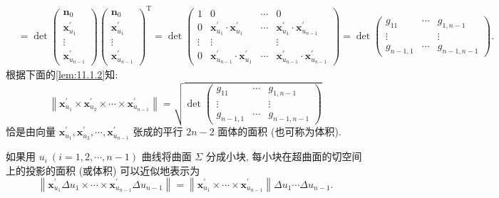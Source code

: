 \begin{definition}
\begin{align*}
  & =\operatorname{det}\begin{pmatrix}
      \boldsymbol{n}_{0} \\ \boldsymbol{x}_{u_{1}}^{\prime} \\ \vdots \\ \boldsymbol{x}_{u_{n-1}}^{\prime}
    \end{pmatrix}
    \begin{pmatrix}
      \boldsymbol{n}_{0} \\ \boldsymbol{x}_{u_{1}}^{\prime} \\ \vdots \\ \boldsymbol{x}_{u_{n-1}}^{\prime}
    \end{pmatrix}^{\mathrm{T}}
  =\operatorname{det}\begin{pmatrix}
      1 & 0 & \cdots & 0 \\
      0 & \boldsymbol{x}_{u_{1}}^{\prime} \cdot \boldsymbol{x}_{u_{1}}^{\prime} & \cdots & \boldsymbol{x}_{u_{1}}^{\prime} \cdot \boldsymbol{x}_{u_{n-1}}^{\prime} \\
      \vdots & \vdots & & \vdots \\
      0 & \boldsymbol{x}_{u_{n-1}}^{\prime} \cdot \boldsymbol{x}_{u_{1}}^{\prime} & \cdots & \boldsymbol{x}_{u_{n-1}}^{\prime} \cdot \boldsymbol{x}_{u_{n-1}}^{\prime}
    \end{pmatrix}
  =\operatorname{det}\begin{pmatrix}
      g_{11} & \cdots & g_{1, n-1} \\
      \vdots & & \vdots \\
      g_{n-1,1} & \cdots & g_{n-1, n-1}
    \end{pmatrix}.
\end{align*}
根据下面的\cref{lem:11.1.2}知:
\[
  \left\|\boldsymbol{x}_{u_{1}}^{\prime} \times \boldsymbol{x}_{u_{2}}^{\prime} \times \cdots \times \boldsymbol{x}_{u_{n-1}}^{\prime}\right\|=\sqrt{\operatorname{det}\begin{pmatrix}
    g_{11} & \cdots & g_{1, n-1} \\
    \vdots & & \vdots \\
    g_{n-1,1} & \cdots & g_{n-1, n-1}
  \end{pmatrix}}
\]
恰是由向量 $\boldsymbol{x}_{u_{1}}^{\prime}, \boldsymbol{x}_{u_{2}}^{\prime}, \cdots, \boldsymbol{x}_{u_{n-1}}^{\prime}$ 张成的平行 $2 n-2$ 面体的面积 (也可称为体积).

如果用 $u_{i}\ (i=1,2, \cdots, n-1)$ 曲线将曲面 $\Sigma$ 分成小块, 每小块在超曲面的切空间上的投影的面积 (或体积) 可以近似地表示为
\[
  \left\|\boldsymbol{x}_{u_{1}}^{\prime} \Delta u_{1} \times \cdots \times \boldsymbol{x}_{u_{n-1}}^{\prime} \Delta u_{n-1}\right\|=\left\|\boldsymbol{x}_{u_{1}}^{\prime} \times \cdots \times \boldsymbol{x}_{u_{n-1}}^{\prime}\right\| \Delta u_{1} \cdots \Delta u_{n-1}.
\]


\end{definition}
